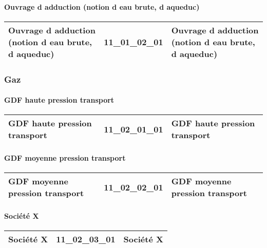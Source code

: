 \documentclass[12pt,titlepage,oneside]{book}
\begin{document}
\paragraph{Ouvrage d adduction (notion d eau brute, d aqueduc)}
\noindent
\vspace{\baselineskip}

\renewcommand{\arraystretch}{1.2}
\begin{supertabular}{|p{10cm}|c|p{15cm}|}
 Ouvrage d adduction (notion d eau brute, d aqueduc) & 11\_01\_02\_01 & Ouvrage d adduction (notion d eau brute, d aqueduc)\\
\hline
\end{supertabular}

\subsubsection{\large Gaz}
\paragraph{GDF haute pression transport}
\noindent
\vspace{\baselineskip}

\renewcommand{\arraystretch}{1.2}
\begin{supertabular}{|p{10cm}|c|p{15cm}|}
 GDF haute pression transport & 11\_02\_01\_01 & GDF haute pression transport\\
\hline
\end{supertabular}


\paragraph{GDF moyenne pression transport}
\noindent
\vspace{\baselineskip}

\renewcommand{\arraystretch}{1.2}
\begin{supertabular}{|p{10cm}|c|p{15cm}|}
 GDF moyenne pression transport & 11\_02\_02\_01 & GDF moyenne pression transport\\
\hline
\end{supertabular}


\paragraph{Société X}
\noindent
\vspace{\baselineskip}

\renewcommand{\arraystretch}{1.2}
\begin{supertabular}{|p{10cm}|c|p{15cm}|}
 Société X & 11\_02\_03\_01 & Société X\\
\hline
\end{supertabular}
\end{document}
